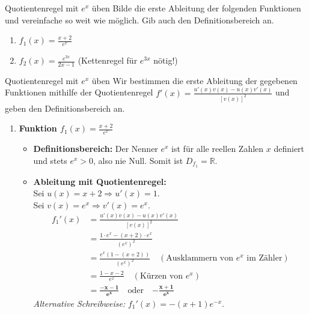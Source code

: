 \begin{aufgabenumgebung}{Quotientenregel mit $e^x$ üben}
Bilde die erste Ableitung der folgenden Funktionen und vereinfache so weit wie möglich. Gib auch den Definitionsbereich an.
\begin{enumerate}
    \item $f_1(x) = \frac{x+2}{e^x}$
    \item $f_2(x) = \frac{e^{3x}}{2x-1}$ (Kettenregel für $e^{3x}$ nötig!)
\end{enumerate}
\end{aufgabenumgebung}

\begin{loesungsumgebung}{Quotientenregel mit $e^x$ üben}
Wir bestimmen die erste Ableitung der gegebenen Funktionen mithilfe der Quotientenregel $f'(x) = \frac{u'(x)v(x) - u(x)v'(x)}{[v(x)]^2}$ und geben den Definitionsbereich an.

\begin{enumerate}[label=(\alph*)]
    \item \textbf{Funktion $f_1(x) = \frac{x+2}{e^x}$}
    \begin{itemize}
        \item \textbf{Definitionsbereich:} Der Nenner $e^x$ ist für alle reellen Zahlen $x$ definiert und stets $e^x > 0$, also nie Null.
        Somit ist $D_{f_1} = \mathbb{R}$.
        \item \textbf{Ableitung mit Quotientenregel:} \\
        Sei $u(x) = x+2 \Rightarrow u'(x) = 1$. \\
        Sei $v(x) = e^x \Rightarrow v'(x) = e^x$.
        \begin{align*}
        f_1'(x) &= \frac{u'(x)v(x) - u(x)v'(x)}{[v(x)]^2} \\
                &= \frac{1 \cdot e^x - (x+2) \cdot e^x}{(e^x)^2} \\
                &= \frac{e^x (1 - (x+2))}{(e^x)^2} \quad (\text{Ausklammern von } e^x \text{ im Zähler}) \\
                &= \frac{1 - x - 2}{e^x} \quad (\text{Kürzen von } e^x) \\
                &= \mathbf{\frac{-x - 1}{e^x}} \quad \text{oder} \quad \mathbf{-\frac{x+1}{e^x}}
        \end{align*}
        \textit{Alternative Schreibweise:} $f_1'(x) = -(x+1)e^{-x}$.
    \end{itemize}


\end{enumerate}
\end{loesungsumgebung}
